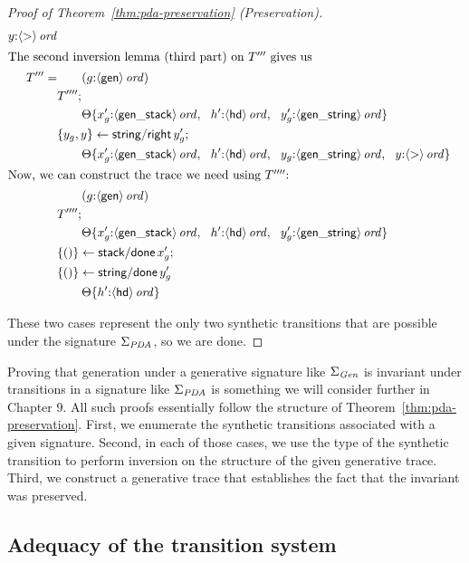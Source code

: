 \begin{proof}[Proof of Theorem~\ref{thm:pda-preservation} (Preservation)]
\begin{align*}
{                   y{:}{\langle {\sf >} \rangle}\,{{\it ord}}}\\
\intertext{The second inversion lemma (third part) on $T'''$ gives us}
T''' = & \qquad ({g{:}{\langle {\sf gen} \rangle}\,{{\it ord}}})\\
& T'''';\\
& \qquad {\Theta}\{{x_g'{:}{\langle {\sf gen\_stack} \rangle}\,{{\it ord}}, ~~
                   h'{:}{\langle {\sf hd} \rangle}\,{{\it ord}}, ~~
                   y_g'{:}{\langle {\sf gen\_string} \rangle}\,{{\it ord}}}\}\\
& \{{y_g, y}\} \leftarrow {{\sf string/right}\,y_g'};\\
& \qquad {\Theta}\{{x_g'{:}{\langle {\sf gen\_stack} \rangle}\,{{\it ord}}, ~~
                   h'{:}{\langle {\sf hd} \rangle}\,{{\it ord}}, ~~
                   y_g{:}{\langle {\sf gen\_string} \rangle}\,{{\it ord}}, ~~
                   y{:}{\langle {\sf >} \rangle}\,{{\it ord}}}\}\\
\intertext{Now, we can construct the trace we need using $T''''$:}
& \qquad ({g{:}{\langle {\sf gen} \rangle}\,{{\it ord}}})\\
& T'''';\\
& \qquad {\Theta}\{{x_g'{:}{\langle {\sf gen\_stack} \rangle}\,{{\it ord}}, ~~
                   h'{:}{\langle {\sf hd} \rangle}\,{{\it ord}}, ~~
                   y_g'{:}{\langle {\sf gen\_string} \rangle}\,{{\it ord}}}\}\\
& \{{()}\} \leftarrow {{\sf stack/done}\,x_g'};\\
& \{{()}\} \leftarrow {{\sf string/done}\,y_g'}\\
& \qquad {\Theta}\{{h'{:}{\langle {\sf hd} \rangle}\,{{\it ord}}}\}
\end{align*}

\noindent
These two cases represent the only two synthetic transitions that are possible
under the signature $\Sigma_{\it PDA}$, so we are done.
\end{proof}

Proving that generation under a generative signature like $\Sigma_{\it
  Gen}$ is invariant under transitions in a signature like
$\Sigma_{\it PDA}$ is something we will consider further
in Chapter 9.  All such proofs essentially follow the structure of
Theorem~\ref{thm:pda-preservation}. First, we enumerate the synthetic
transitions associated with a given signature. Second, in each of those
cases, we use the type of the synthetic transition to perform
inversion on the structure of the given generative trace.
Third, we construct a generative
trace that establishes the fact that the invariant was preserved.

\subsection{Adequacy of the transition system}
\label{sec:pda-adequacy}

